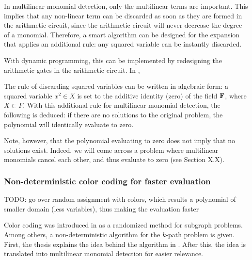 In multilinear monomial detection, only the multilinear terms are important. This implies that any non-linear term can be discarded 
as soon as they are formed in the arithmetic circuit, since the arithmetic circuit will never decrease the degree of a monomial. 
Therefore, a smart algorithm can be designed for the expansion that applies an additional rule: 
any squared variable can be instantly discarded.

With dynamic programming, this can be implemented by redesigning the arithmetic gates in the arithmetic circuit. 
In ,

The rule of discarding squared variables can be written in algebraic form: 
a squared variable $x^2 \in X$ is set to the additive identity (zero) of the field $\textbf F$, 
where $X \subset F$. 
With this additional rule for multilinear monomial detection, the following is deduced: 
if there are no solutions to the original problem, 
the polynomial will identically evaluate to zero.

Note, however, that the polynomial evaluating to zero does not
imply that no
solutions exist. 
Indeed, we will come across a problem where multilinear monomials cancel each other, 
and thus evaluate to zero (see Section X.X).

\subsubsection{Non-deterministic color coding for faster evaluation}


TODO: go over random assignment with colors, 
which results a polynomial of smaller domain (less variables), thus 
making the evaluation faster

Color coding was introduced in \cite{Alon95} as a randomized method for subgraph problems. Among others, 
a non-deterministic algorithm for the $k$-path problem is given.
First, the thesis explains the idea behind the algorithm in \cite{Alon95}. 
After this, the idea is translated into multilinear monomial detection for easier relevance.


